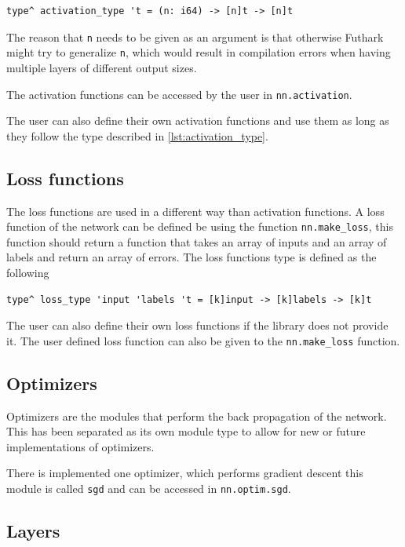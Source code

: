 \begin{lstlisting}[caption=The type definition of activation functions., label={lst:activation_type}]
type^ activation_type 't = (n: i64) -> [n]t -> [n]t
\end{lstlisting}

The reason that \texttt{n} needs to be given as an argument is that otherwise Futhark might try to generalize \texttt{n}, which would result in compilation errors when having multiple layers of different output sizes.

The activation functions can be accessed by the user in \texttt{nn.activation}.

The user can also define their own activation functions and use them as long as they follow the type described in \autoref{lst:activation_type}.

\subsection{Loss functions}

The loss functions are used in a different way than activation functions. A loss function of the network can be defined be using the function \texttt{nn.make\_loss}, this function should return a function that takes an array of inputs and an array of labels and return an array of errors. The loss functions type is defined as the following

\begin{lstlisting}
type^ loss_type 'input 'labels 't = [k]input -> [k]labels -> [k]t
\end{lstlisting}

The user can also define their own loss functions if the library does not provide it. The user defined loss function can also be given to the \texttt{nn.make\_loss} function.

\subsection{Optimizers}

Optimizers are the modules that perform the back propagation of the network.
This has been separated as its own module type to allow for new or future implementations of optimizers.

There is implemented one optimizer, which performs gradient descent this module is called \texttt{sgd} and can be accessed in \texttt{nn.optim.sgd}.

\subsection{Layers}%
\label{sub:layers}

